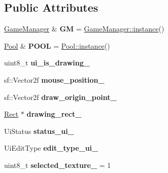 \subsection*{Public Attributes}
\begin{DoxyCompactItemize}
\item 
\mbox{\label{class_user_interface_abe6c892ad6e49850ebc8dfeb18b9b2ea}} 
\hyperlink{class_game_manager}{Game\+Manager} \& {\bfseries GM} = \hyperlink{class_game_manager_afa37ab23c040b5225d567d4c9ab854e1}{Game\+Manager\+::instance}()
\item 
\mbox{\label{class_user_interface_a5cdf09519e08c374c5d8c06d4b7f79ba}} 
\hyperlink{class_pool}{Pool} \& {\bfseries P\+O\+OL} = \hyperlink{class_pool_a20e44e0054d4eedf57f1943b87c06e20}{Pool\+::instance}()
\item 
\mbox{\label{class_user_interface_a8b79c4106bdfd6a2e028ff536d4784e7}} 
uint8\+\_\+t {\bfseries ui\+\_\+is\+\_\+drawing\+\_\+}
\item 
\mbox{\label{class_user_interface_a722198e573fa759bab209f579732387a}} 
sf\+::\+Vector2f {\bfseries mouse\+\_\+position\+\_\+}
\item 
\mbox{\label{class_user_interface_a14f25d82f34107b468ec6fdc38e1863a}} 
sf\+::\+Vector2f {\bfseries draw\+\_\+origin\+\_\+point\+\_\+}
\item 
\mbox{\label{class_user_interface_a66b686d9ecf576e5d2e0f7209167ee7c}} 
\hyperlink{class_rect}{Rect} $\ast$ {\bfseries drawing\+\_\+rect\+\_\+}
\item 
\mbox{\label{class_user_interface_aec6933edc37df360de4ebe1a2584e701}} 
Ui\+Status {\bfseries status\+\_\+ui\+\_\+}
\item 
\mbox{\label{class_user_interface_a4a9fac2665f543689078ced520b744fb}} 
Ui\+Edit\+Type {\bfseries edit\+\_\+type\+\_\+ui\+\_\+}
\item 
\mbox{\label{class_user_interface_a22cae55eb570361a8c3fbc6876feac84}} 
uint8\+\_\+t {\bfseries selected\+\_\+texture\+\_\+} = 1
\end{DoxyCompactItemize}


